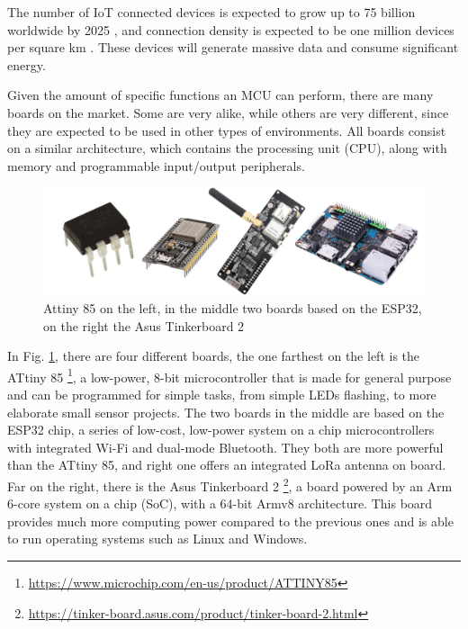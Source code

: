 		The number of IoT connected devices is expected to grow up to 75 billion worldwide by 2025 \cite{statista}, and connection density is expected to be one million devices per square km \cite{noma}.
		These devices will generate massive data and consume significant energy.
		
		Given the amount of specific functions an MCU can perform, there are many boards on the market.
		Some are very alike, while others are very different, since they are expected to be used in other types of environments.
		All boards consist on a similar architecture, which contains the processing unit (CPU), along with memory and programmable input/output peripherals.
		
		\begin{figure}[H]
			\centering
			\includegraphics[width=\textwidth]{resources/img/chap3/generic_board}
			\caption{Attiny 85 on the left, in the middle two boards based on the ESP32, on the right the Asus Tinkerboard 2}
			\label{img:generic_board}
		\end{figure}
	
		In Fig. \ref{img:generic_board}, there are four different boards, the one farthest on the left is the ATtiny 85 \footnote{\url{https://www.microchip.com/en-us/product/ATTINY85}}, a low-power, 8-bit microcontroller that is made for general purpose and can be programmed for simple tasks, from simple LEDs flashing, to more elaborate small sensor projects.
		The two boards in the middle are based on the ESP32 chip, a series of low-cost, low-power system on a chip microcontrollers with integrated Wi-Fi and dual-mode Bluetooth.
		They both are more powerful than the ATtiny 85, and right one offers an integrated LoRa antenna on board.
		Far on the right, there is the Asus Tinkerboard 2 \footnote{\url{https://tinker-board.asus.com/product/tinker-board-2.html}}, a board powered by an Arm 6-core system on a chip (SoC), with a 64-bit Armv8 architecture.
		This board provides much more computing power compared to the previous ones and is able to run operating systems such as Linux and Windows.
		
